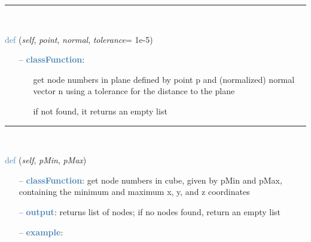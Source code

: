 \begin{itemize}[leftmargin=1.4cm]
\begin{itemize}[leftmargin=1.4cm]
\begin{itemize}[leftmargin=0.5cm]
\begin{itemize}[leftmargin=1.4cm]
\begin{itemize}[leftmargin=1.4cm]
\begin{itemize}[leftmargin=0.5cm]
\begin{itemize}[leftmargin=0.7cm]
\begin{itemize}[leftmargin=1.2cm]
  \end{itemize}
\vspace{12pt}\end{itemize}
%
\noindent\rule{8cm}{0.75pt}\vspace{1pt} \\ 
\begin{flushleft}
\noindent \textcolor{steelblue}{def {\bf {}}}\label{sec:FEM:FEMinterface:GetNodesInPlane}
({\it self}, {\it point}, {\it normal}, {\it tolerance}= 1e-5)
\end{flushleft}
\setlength{\itemindent}{0.7cm}
\begin{itemize}[leftmargin=0.7cm]
  \item[--]  \textcolor{steelblue}{\bf classFunction}: \vspace{-6pt}
  \begin{itemize}[leftmargin=1.2cm]
\setlength{\itemindent}{-0.7cm}
    \item[] get node numbers in plane defined by point p and (normalized) normal vector n using a tolerance for the distance to the plane
    \item[] if not found, it returns an empty list
  \end{itemize}
\vspace{12pt}\end{itemize}
%
\noindent\rule{8cm}{0.75pt}\vspace{1pt} \\ 
\begin{flushleft}
\noindent \textcolor{steelblue}{def {\bf {}}}\label{sec:FEM:FEMinterface:GetNodesInCube}
({\it self}, {\it pMin}, {\it pMax})
\end{flushleft}
\setlength{\itemindent}{0.7cm}
\begin{itemize}[leftmargin=0.7cm]
  \item[--]  \textcolor{steelblue}{\bf classFunction}: get node numbers in cube, given by pMin and pMax, containing the minimum and maximum x, y, and z coordinates  \item[--]  \textcolor{steelblue}{\bf output}: returns list of nodes; if no nodes found, return an empty list  \item[--]  \textcolor{steelblue}{\bf example}: \vspace{-12pt}\ei\begin{lstlisting}[language=Python, xleftmargin=36pt]

\end{lstlisting}
\end{itemize}
\end{itemize}
\end{itemize}
\end{itemize}
\end{itemize}
\end{itemize}
\end{itemize}
